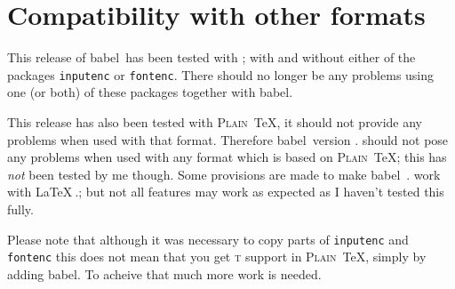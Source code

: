 \documentclass{ltugboat}
\newcommand*{\pkg}[1]{\texttt{#1}}
\newcommand*\babel{\textsf{babel}}
\let\osn\oldstylenums
\begin{document}
\section{Compatibility with other formats}

This release of \babel\ has been tested with \LaTeXe; with and
without either of the packages \pkg{inputenc} or \pkg{fontenc}. There
should no longer be any problems using one (or both) of these packages
together with \babel.

\noindent This release has also been tested with \textsc{Plain}~\TeX, it should
not provide any problems when used with that format.  Therefore
\babel~version \osn{3}.\osn{5} should not pose any problems when used
with any format which is based on \textsc{Plain}~\TeX; this has
\emph{not} been tested by me though.  Some provisions are made to make
\babel~\osn{3}.\osn{5} work with \LaTeX$\:$\osn{2}.\osn{09}; but not
all features may work as expected as I haven't tested this fully.

Please note that although it was necessary to copy parts of
\pkg{inputenc} and \pkg{fontenc} this does not mean that you get
\textsc{t}\osn{1} support in \textsc{Plain}~\TeX, simply by adding
\babel. To acheive that much more work is needed.
\end{document}
